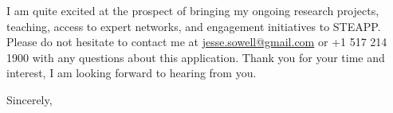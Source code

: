 \documentclass[11pt]{letter}
\begin{document}
\begin{letter}


%
I am quite excited at the prospect of bringing my ongoing research projects, teaching, access to expert networks, and engagement initiatives to STEAPP.
%
Please do not hesitate to contact me at \href{mailto:jesse.sowell@gmail.com}{jesse.sowell@gmail.com} or +1 517 214 1900 with any questions about this application.
%
Thank you for your time and interest, I am looking forward to hearing from you.

\vspace{\baselineskip}



\closing{Sincerely,}




\end{letter}
\end{document}
